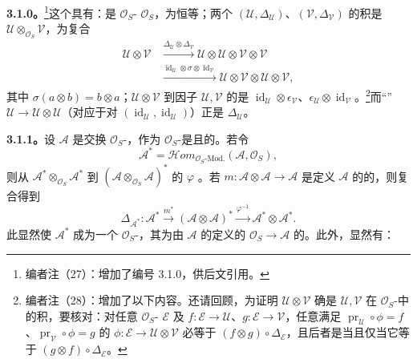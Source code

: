 \textbf{3.1.0。}\footnote{编者注（27）：增加了编号 3.1.0，供后文引用。}这个具有：是 $\mathcal O_S$- $\mathcal O_S$，为恒等；两个 $(\mathcal U,\Delta_{\mathcal U})$、$(\mathcal V,\Delta_{\mathcal V})$ 的积是 $\mathcal U\otimes_{\mathcal O_S}\mathcal V$，为复合
\[
\begin{aligned}
\mathcal U\otimes\mathcal V&\xrightarrow{\Delta_{\mathcal U}\otimes\Delta_{\mathcal V}}\mathcal U\otimes\mathcal U\otimes\mathcal V\otimes\mathcal V\\
&\xrightarrow{\operatorname{id}_{\mathcal U}\otimes\sigma\otimes\operatorname{id}_{\mathcal V}}\mathcal U\otimes\mathcal V\otimes\mathcal U\otimes\mathcal V,
\end{aligned}
\]
其中 $\sigma(a\otimes b)=b\otimes a$；$\mathcal U\otimes\mathcal V$ 到因子 $\mathcal U,\mathcal V$ 的是 $\operatorname{id}_{\mathcal U}\otimes\epsilon_{\mathcal V}$、$\epsilon_{\mathcal U}\otimes\operatorname{id}_{\mathcal V}$。\footnote{编者注（28）：增加了以下内容。还请回顾，为证明 $\mathcal U\otimes\mathcal V$ 确是 $\mathcal U,\mathcal V$ 在 $\mathcal O_S$-中的积，要核对：对任意 $\mathcal O_S$- $\mathcal E$ 及 $f:\mathcal E\to\mathcal U$、$g:\mathcal E\to\mathcal V$，任意满足 $\operatorname{pr}_{\mathcal U}\circ\phi=f$、$\operatorname{pr}_{\mathcal V}\circ\phi=g$ 的 $\phi:\mathcal E\to\mathcal U\otimes\mathcal V$ 必等于 $(f\otimes g)\circ\Delta_{\mathcal E}$，且后者是当且仅当它等于 $(g\otimes f)\circ\Delta_{\mathcal E}$。}而“”$\mathcal U\to\mathcal U\otimes\mathcal U$（对应于对 $(\operatorname{id}_{\mathcal U},\operatorname{id}_{\mathcal U})$）正是 $\Delta_{\mathcal U}$。

\textbf{3.1.1。}设 $\mathcal A$ 是交换 $\mathcal O_S$-，作为 $\mathcal O_S$-是且的。若令
\[
\mathcal A^*=\mathcal Hom_{\mathcal O_S\text{-}\mathrm{Mod.}}(\mathcal A,\mathcal O_S),
\]
则从 $\mathcal A^*\otimes_{\mathcal O_S}\mathcal A^*$ 到 $(\mathcal A\otimes_{\mathcal O_S}\mathcal A)^*$ 的 $\varphi$ 。若 $m:\mathcal A\otimes\mathcal A\to\mathcal A$ 是定义 $\mathcal A$ 的的，则复合得到
\[
\Delta_{\mathcal A^*}:\mathcal A^*\xrightarrow{m^*}(\mathcal A\otimes\mathcal A)^*\xrightarrow{\varphi^{-1}}\mathcal A^*\otimes\mathcal A^*.
\]
此显然使 $\mathcal A^*$ 成为一个 $\mathcal O_S$-，其为由 $\mathcal A$ 的定义的 $\mathcal O_S\to\mathcal A$ 的。此外，显然有：

